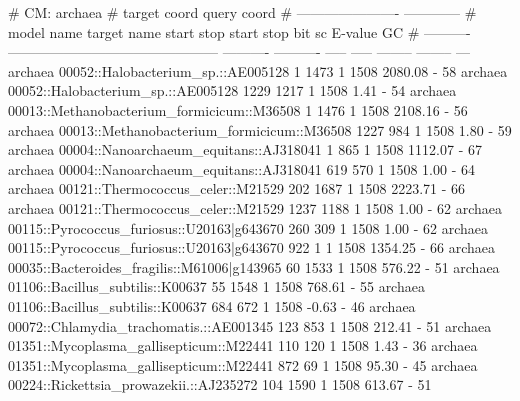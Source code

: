 \begin{sreoutputtiny}
# CM: archaea
#                                                                      target coord   query coord                         
#                                                            ----------------------  ------------                         
# model name  target name                                         start        stop  start   stop    bit sc   E-value  GC%
# ----------  ---------------------------------------------  ----------  ----------  -----  -----  --------  --------  ---
  archaea     00052::Halobacterium_sp.::AE005128                      1        1473      1   1508   2080.08         -   58
  archaea     00052::Halobacterium_sp.::AE005128                   1229        1217      1   1508      1.41         -   54
  archaea     00013::Methanobacterium_formicicum::M36508              1        1476      1   1508   2108.16         -   56
  archaea     00013::Methanobacterium_formicicum::M36508           1227         984      1   1508      1.80         -   59
  archaea     00004::Nanoarchaeum_equitans::AJ318041                  1         865      1   1508   1112.07         -   67
  archaea     00004::Nanoarchaeum_equitans::AJ318041                619         570      1   1508      1.00         -   64
  archaea     00121::Thermococcus_celer::M21529                     202        1687      1   1508   2223.71         -   66
  archaea     00121::Thermococcus_celer::M21529                    1237        1188      1   1508      1.00         -   62
  archaea     00115::Pyrococcus_furiosus::U20163|g643670            260         309      1   1508      1.00         -   62
  archaea     00115::Pyrococcus_furiosus::U20163|g643670            922           1      1   1508   1354.25         -   66
  archaea     00035::Bacteroides_fragilis::M61006|g143965            60        1533      1   1508    576.22         -   51
  archaea     01106::Bacillus_subtilis::K00637                       55        1548      1   1508    768.61         -   55
  archaea     01106::Bacillus_subtilis::K00637                      684         672      1   1508     -0.63         -   46
  archaea     00072::Chlamydia_trachomatis.::AE001345               123         853      1   1508    212.41         -   51
  archaea     01351::Mycoplasma_gallisepticum::M22441               110         120      1   1508      1.43         -   36
  archaea     01351::Mycoplasma_gallisepticum::M22441               872          69      1   1508     95.30         -   45
  archaea     00224::Rickettsia_prowazekii.::AJ235272               104        1590      1   1508    613.67         -   51

\end{sreoutputtiny}
